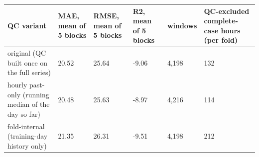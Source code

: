 \begin{tabular}{llllll}
\hline
QC variant & MAE, mean of 5 blocks & RMSE, mean of 5 blocks & R2, mean of 5 blocks & windows & QC-excluded complete-case hours (per fold) \\
\hline
original (QC built once on the full series) & 20.52 & 25.64 & -9.06 & 4,198 & 132 \\
hourly past-only (running median of the day so far) & 20.48 & 25.63 & -8.97 & 4,216 & 114 \\
fold-internal (training-day history only) & 21.35 & 26.31 & -9.51 & 4,198 & 212 \\
\hline
\end{tabular}

